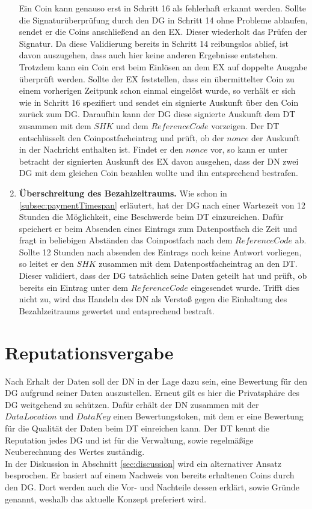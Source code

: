 \documentclass[
	fontsize=11pt,
	headings=small,
	parskip=half,           %
	bibliography=totoc,
	numbers=noenddot,       %
	open=any,               %
]{scrreprt}
\begin{document}
\begin{enumerate}
    Ein Coin kann genauso erst in Schritt 16 als fehlerhaft erkannt werden. Sollte die Signaturüberprüfung durch den DG in Schritt 14 ohne Probleme ablaufen, sendet er die Coins anschließend an den EX. Dieser wiederholt das Prüfen der Signatur. Da diese Validierung bereits in Schritt 14 reibungslos ablief, ist davon auszugehen, dass auch hier keine anderen Ergebnisse entstehen. Trotzdem kann ein Coin erst beim Einlösen an dem EX auf doppelte Ausgabe überprüft werden. Sollte der EX feststellen, dass ein übermittelter Coin zu einem vorherigen Zeitpunk schon einmal eingelöst wurde, so verhält er sich wie in Schritt 16 spezifiert und sendet ein signierte Auskunft über den Coin zurück zum DG. Daraufhin kann der DG diese signierte Auskunft dem DT zusammen mit dem $SHK$ und dem $ReferenceCode$ vorzeigen. Der DT entschlüsselt den Coinpostfacheintrag und prüft, ob der $nonce$ der Auskunft in der Nachricht enthalten ist. Findet er den $nonce$ vor, so kann er unter betracht der signierten Auskunft des EX davon ausgehen, dass der DN zwei DG mit dem gleichen Coin bezahlen wollte und ihn entsprechend bestrafen.

    \item \textbf{Überschreitung des Bezahlzeitraums.} \label{case:paymentExceeded}
    Wie schon in \ref{subsec:paymentTimespan} erläutert, hat der DG nach einer Wartezeit von 12 Stunden die Möglichkeit, eine Beschwerde beim DT einzureichen. Dafür speichert er beim Absenden eines Eintrags zum Datenpostfach die Zeit und fragt in beliebigen Abständen das Coinpostfach nach dem $ReferenceCode$ ab. Sollte 12 Stunden nach absenden des Eintrags noch keine Antwort vorliegen, so leitet er den $SHK$ zusammen mit dem Datenpostfacheintrag an den DT. Dieser validiert, dass der DG tatsächlich seine Daten geteilt hat und prüft, ob bereits ein Eintrag unter dem $ReferenceCode$ eingesendet wurde. Trifft dies nicht zu, wird das Handeln des DN als Verstoß gegen die Einhaltung des Bezahlzeitraums gewertet und entsprechend bestraft.
\end{enumerate}


\section{Reputationsvergabe}
\label{system:reputation}
Nach Erhalt der Daten soll der DN in der Lage dazu sein, eine Bewertung für den DG aufgrund seiner Daten auszustellen. Erneut gilt es hier die Privatsphäre des DG weitgehend zu schützen. Dafür erhält der DN zusammen mit der $DataLocation$ und $DataKey$ einen Bewertungstoken, mit dem er eine Bewertung für die Qualität der Daten beim DT einreichen kann. Der DT kennt die Reputation jedes DG und ist für die Verwaltung, sowie regelmäßige Neuberechnung des Wertes zuständig.\\
In der Diskussion in Abschnitt \ref{sec:discussion} wird ein alternativer Ansatz besprochen. Er basiert auf einem Nachweis von bereits erhaltenen Coins durch den DG. Dort werden auch die Vor- und Nachteile dessen erklärt, sowie Gründe genannt, weshalb das aktuelle Konzept preferiert wird.
\end{document}
